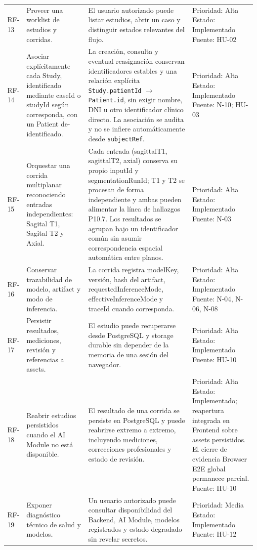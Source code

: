 {\begin{longtable}{>{\raggedright\arraybackslash}p{} >{\raggedright\arraybackslash}p{} >{\raggedright\arraybackslash}p{} >{\raggedright\arraybackslash}p{}}
RF-13 & Proveer una worklist de estudios y corridas. & El usuario autorizado puede listar estudios, abrir un caso y distinguir estados relevantes del flujo. & Prioridad: Alta Estado: Implementado Fuente: HU-02 \\
RF-14 & Asociar explícitamente cada Study, identificado mediante caseId o studyId según corresponda, con un Patient de-identificado. & La creación, consulta y eventual reasignación conservan identificadores estables y una relación explícita \texttt{Study.patientId} \ensuremath{\rightarrow} \texttt{Patient.id}, sin exigir nombre, DNI u otro identificador clínico directo. La asociación se audita y no se infiere automáticamente desde \texttt{subjectRef}. & Prioridad: Alta Estado: Implementado Fuente: N-10; HU-03 \\
RF-15 & Orquestar una corrida multiplanar reconociendo entradas independientes: Sagital T1, Sagital T2 y Axial. & Cada entrada (sagittalT1, sagittalT2, axial) conserva su propio inputId y segmentationRunId; T1 y T2 se procesan de forma independiente y ambas pueden alimentar la línea de hallazgos P10.7. Los resultados se agrupan bajo un identificador común sin asumir correspondencia espacial automática entre planos. & Prioridad: Alta Estado: Implementado Fuente: N-03 \\
RF-16 & Conservar trazabilidad de modelo, artifact y modo de inferencia. & La corrida registra modelKey, versión, hash del artifact, requestedInferenceMode, effectiveInferenceMode y traceId cuando corresponda. & Prioridad: Alta Estado: Implementado Fuente: N-04, N-06, N-08 \\
RF-17 & Persistir resultados, mediciones, revisión y referencias a assets. & El estudio puede recuperarse desde PostgreSQL y storage durable sin depender de la memoria de una sesión del navegador. & Prioridad: Alta Estado: Implementado Fuente: HU-10 \\
RF-18 & Reabrir estudios persistidos cuando el AI Module no está disponible. & El resultado de una corrida se persiste en PostgreSQL y puede reabrirse extremo a extremo, incluyendo mediciones, correcciones profesionales y estado de revisión. & Prioridad: Alta Estado: Implementado; reapertura integrada en Frontend sobre assets persistidos. El cierre de evidencia Browser E2E global permanece parcial. Fuente: HU-10 \\
RF-19 & Exponer diagnóstico técnico de salud y modelos. & Un usuario autorizado puede consultar disponibilidad del Backend, AI Module, modelos registrados y estado degradado sin revelar secretos. & Prioridad: Media Estado: Implementado Fuente: HU-12 \\

\end{longtable}}
